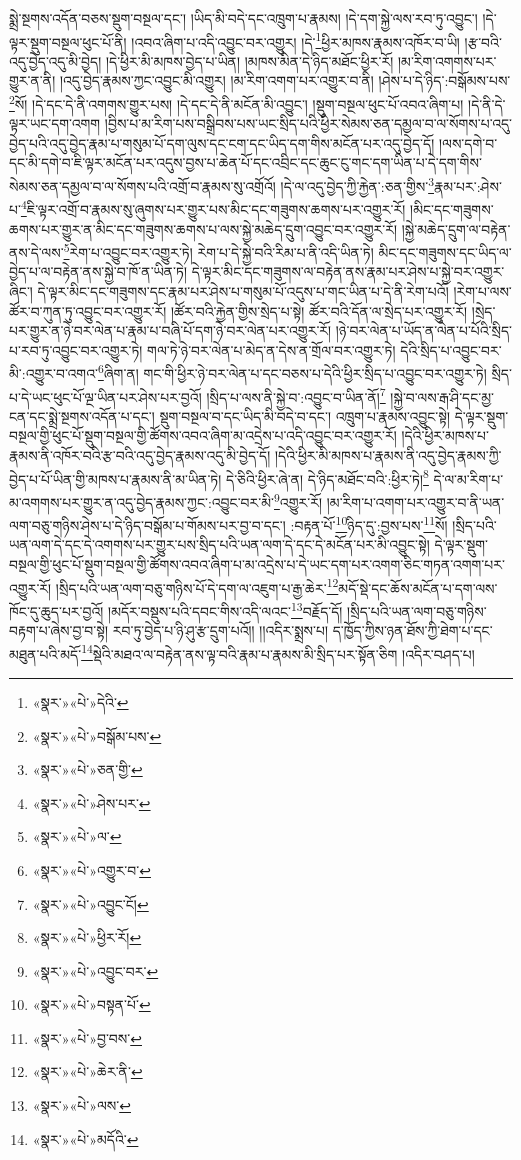 སྨྲེ་སྔགས་འདོན་བཅས་སྡུག་བསྔལ་དང་། །ཡིད་མི་བདེ་དང་འཁྲུག་པ་རྣམས། །དེ་དག་སྐྱེ་ལས་རབ་ཏུ་འབྱུང་། །དེ་ལྟར་སྡུག་བསྔལ་ཕུང་པོ་ནི། །འབའ་ཞིག་པ་འདི་འབྱུང་བར་འགྱུར། །དེ་\footnote{«སྣར་»«པེ་»དེའི་}ཕྱིར་མཁས་རྣམས་འཁོར་བ་ཡི། །རྩ་བའི་འདུ་བྱེད་འདུ་མི་བྱེད། །དེ་ཕྱིར་མི་མཁས་བྱེད་པ་ཡིན། །མཁས་མིན་དེ་ཉིད་མཐོང་ཕྱིར་རོ། །མ་རིག་འགགས་པར་གྱུར་ན་ནི། །འདུ་བྱེད་རྣམས་ཀྱང་འབྱུང་མི་འགྱུར། །མ་རིག་འགག་པར་འགྱུར་བ་ནི། །ཤེས་པ་དེ་ཉིད་:བསྒོམས་པས་\footnote{«སྣར་»«པེ་»བསྒོམ་པས་}སོ། །དེ་དང་དེ་ནི་འགགས་གྱུར་པས། །དེ་དང་དེ་ནི་མངོན་མི་འབྱུང་། །སྡུག་བསྔལ་ཕུང་པོ་འབའ་ཞིག་པ། །དེ་ནི་དེ་ལྟར་ཡང་དག་འགག །བྱིས་པ་མ་རིག་པས་བསྒྲིབས་པས་ཡང་སྲིད་པའི་ཕྱིར་སེམས་ཅན་དམྱལ་བ་ལ་སོགས་པ་འདུ་བྱེད་པའི་འདུ་བྱེད་རྣམ་པ་གསུམ་པོ་དག་ལུས་དང་ངག་དང་ཡིད་དག་གིས་མངོན་པར་འདུ་བྱེད་དོ། །ལས་དགེ་བ་དང་མི་དགེ་བ་ཇི་ལྟར་མངོན་པར་འདུས་བྱས་པ་ཆེན་པོ་དང་འབྲིང་དང་ཆུང་ངུ་གང་དག་ཡིན་པ་དེ་དག་གིས་སེམས་ཅན་དམྱལ་བ་ལ་སོགས་པའི་འགྲོ་བ་རྣམས་སུ་འགྲོའོ། །དེ་ལ་འདུ་བྱེད་ཀྱི་རྐྱེན་:ཅན་གྱིས་\footnote{«སྣར་»«པེ་»ཅན་གྱི་}རྣམ་པར་:ཤེས་པ་\footnote{«སྣར་»«པེ་»ཤེས་པར་}ཇི་ལྟར་འགྲོ་བ་རྣམས་སུ་ཞུགས་པར་གྱུར་པས་མིང་དང་གཟུགས་ཆགས་པར་འགྱུར་རོ། །མིང་དང་གཟུགས་ཆགས་པར་གྱུར་ན་མིང་དང་གཟུགས་ཆགས་པ་ལས་སྐྱེ་མཆེད་དྲུག་འབྱུང་བར་འགྱུར་རོ། །སྐྱེ་མཆེད་དྲུག་ལ་བརྟེན་ནས་དེ་ལས་\footnote{«སྣར་»«པེ་»ལ་}རེག་པ་འབྱུང་བར་འགྱུར་ཏེ། རེག་པ་དེ་སྐྱེ་བའི་རིམ་པ་ནི་འདི་ཡིན་ཏེ། མིང་དང་གཟུགས་དང་ཡིད་ལ་བྱེད་པ་ལ་བརྟེན་ནས་སྐྱེ་བ་ཁོ་ན་ཡིན་ཏེ། དེ་ལྟར་མིང་དང་གཟུགས་ལ་བརྟེན་ནས་རྣམ་པར་ཤེས་པ་སྐྱེ་བར་འགྱུར་ཞིང་། དེ་ལྟར་མིང་དང་གཟུགས་དང་རྣམ་པར་ཤེས་པ་གསུམ་པོ་འདུས་པ་གང་ཡིན་པ་དེ་ནི་རེག་པའོ། །རེག་པ་ལས་ཚོར་བ་ཀུན་ཏུ་འབྱུང་བར་འགྱུར་རོ། །ཚོར་བའི་རྐྱེན་གྱིས་སྲེད་པ་སྟེ། ཚོར་བའི་དོན་ལ་སྲེད་པར་འགྱུར་རོ། །སྲེད་པར་གྱུར་ན་ཉེ་བར་ལེན་པ་རྣམ་པ་བཞི་པོ་དག་ཉེ་བར་ལེན་པར་འགྱུར་རོ། །ཉེ་བར་ལེན་པ་ཡོད་ན་ལེན་པ་པོའི་སྲིད་པ་རབ་ཏུ་འབྱུང་བར་འགྱུར་ཏེ། གལ་ཏེ་ཉེ་བར་ལེན་པ་མེད་ན་དེས་ན་གྲོལ་བར་འགྱུར་ཏེ། དེའི་སྲིད་པ་འབྱུང་བར་མི་:འགྱུར་བ་འགའ་\footnote{«སྣར་»«པེ་»འགྱུར་བ་}ཞིག་ན། གང་གི་ཕྱིར་ཉེ་བར་ལེན་པ་དང་བཅས་པ་དེའི་ཕྱིར་སྲིད་པ་འབྱུང་བར་འགྱུར་ཏེ། སྲིད་པ་དེ་ཡང་ཕུང་པོ་ལྔ་ཡིན་པར་ཤེས་པར་བྱའོ། །སྲིད་པ་ལས་ནི་སྐྱེ་བ་:འབྱུང་བ་ཡིན་ནོ།\footnote{«སྣར་»«པེ་»འབྱུང་ངོ།} །སྐྱེ་བ་ལས་རྒ་ཤི་དང་མྱ་ངན་དང་སྨྲེ་སྔགས་འདོན་པ་དང་། སྡུག་བསྔལ་བ་དང་ཡིད་མི་བདེ་བ་དང་། འཁྲུག་པ་རྣམས་འབྱུང་སྟེ། དེ་ལྟར་སྡུག་བསྔལ་གྱི་ཕུང་པོ་སྡུག་བསྔལ་གྱི་ཚོགས་འབའ་ཞིག་མ་འདྲེས་པ་འདི་འབྱུང་བར་འགྱུར་རོ། །དེའི་ཕྱིར་མཁས་པ་རྣམས་ནི་འཁོར་བའི་རྩ་བའི་འདུ་བྱེད་རྣམས་འདུ་མི་བྱེད་དོ། །དེའི་ཕྱིར་མི་མཁས་པ་རྣམས་ནི་འདུ་བྱེད་རྣམས་ཀྱི་བྱེད་པ་པོ་ཡིན་གྱི་མཁས་པ་རྣམས་ནི་མ་ཡིན་ཏེ། དེ་ཅིའི་ཕྱིར་ཞེ་ན། དེ་ཉིད་མཐོང་བའི་:ཕྱིར་ཏེ།\footnote{«སྣར་»«པེ་»ཕྱིར་རོ།} དེ་ལ་མ་རིག་པ་མ་འགགས་པར་གྱུར་ན་འདུ་བྱེད་རྣམས་ཀྱང་:འབྱུང་བར་མི་\footnote{«སྣར་»«པེ་»འབྱུང་བར་}འགྱུར་རོ། །མ་རིག་པ་འགག་པར་འགྱུར་བ་ནི་ཡན་ལག་བཅུ་གཉིས་ཤེས་པ་དེ་ཉིད་བསྒོམ་པ་གོམས་པར་བྱ་བ་དང་། :བརྟན་པོ་\footnote{«སྣར་»«པེ་»བསྟན་པོ་}ཉིད་དུ་:བྱས་པས་\footnote{«སྣར་»«པེ་»བྱ་བས་}སོ། །སྲིད་པའི་ཡན་ལག་དེ་དང་དེ་འགགས་པར་གྱུར་པས་སྲིད་པའི་ཡན་ལག་དེ་དང་དེ་མངོན་པར་མི་འབྱུང་སྟེ། དེ་ལྟར་སྡུག་བསྔལ་གྱི་ཕུང་པོ་སྡུག་བསྔལ་གྱི་ཚོགས་འབའ་ཞིག་པ་མ་འདྲེས་པ་དེ་ཡང་དག་པར་འགག་ཅིང་གཏན་འགག་པར་འགྱུར་རོ། །སྲིད་པའི་ཡན་ལག་བཅུ་གཉིས་པོ་དེ་དག་ལ་འཇུག་པ་རྒྱ་ཆེར་\footnote{«སྣར་»«པེ་»ཆེར་ནི་}མདོ་སྡེ་དང་ཆོས་མངོན་པ་དག་ལས་ཁོང་དུ་ཆུད་པར་བྱའོ། །མདོར་བསྡུས་པའི་དབང་གིས་འདི་ལའང་\footnote{«སྣར་»«པེ་»ལས་}བརྗོད་དོ། །སྲིད་པའི་ཡན་ལག་བཅུ་གཉིས་བརྟག་པ་ཞེས་བྱ་བ་སྟེ། རབ་ཏུ་བྱེད་པ་ཉི་ཤུ་རྩ་དྲུག་པའོ།། །།འདིར་སྨྲས་པ། ད་ཁྱོད་ཀྱིས་ཉན་ཐོས་ཀྱི་ཐེག་པ་དང་མཐུན་པའི་མདོ་\footnote{«སྣར་»«པེ་»མདོའི་}སྡེའི་མཐའ་ལ་བརྟེན་ནས་ལྟ་བའི་རྣམ་པ་རྣམས་མི་སྲིད་པར་སྟོན་ཅིག །འདིར་བཤད་པ། 